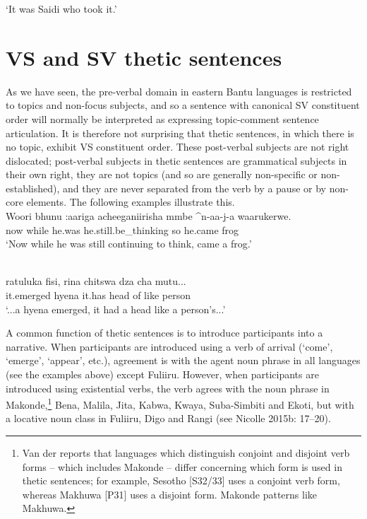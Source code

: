 \documentclass[output=paper]{langsci/langscibook}
\begin{document}
\glt \textup{‘}\textup{It was Saidi who took it.’}
\z

\section{VS and SV thetic sentences}
As we have seen, the pre-verbal domain in eastern Bantu languages is restricted to topics and non-focus subjects, and so a sentence with canonical SV constituent order will normally be interpreted as expressing topic-comment sentence articulation. It is therefore not surprising that thetic sentences, in which there is no topic, exhibit VS constituent order. These post-verbal subjects are not right dislocated; post-verbal subjects in thetic sentences are grammatical subjects in their own right, they are not topics (and so are generally non-specific or non-established), and they are never separated from the verb by a pause or by non-core elements. The following examples illustrate this.
\ea\label{ex:}
\\
\gll Woori bhunu :aariga acheeganiirisha mmbe \^{}n-aa-j-a waarukerwe.\\
now while he.was he.still.be\_thinking so he.came frog\\
‘Now while he was still continuing to think, came a frog.’
\z

\ea\label{ex:}
\\
\gll ratuluka fisi, rina chitswa dza cha mutu...\\
it.emerged hyena it.has head of like person\\
\upshape
‘...a hyena emerged, it had a head like a person’s...’
\z

A common function of thetic sentences is to introduce participants into a narrative. When participants are introduced using a verb of arrival (‘come’, ‘emerge’, ‘appear’, etc.), agreement is with the agent noun phrase in all languages (see the examples above) except Fuliiru. However, when participants are introduced using existential verbs, the verb agrees with the noun phrase in Makonde,\footnote{Van der \citet{Wal2008} reports that languages which distinguish conjoint and disjoint verb forms – which includes Makonde – differ concerning which form is used in thetic sentences; for example, Sesotho [S32/33] uses a conjoint verb form, whereas Makhuwa [P31] uses a disjoint form. Makonde patterns like Makhuwa.} Bena, Malila, Jita, Kabwa, Kwaya, Suba-Simbiti and Ekoti, but with a locative noun class in Fuliiru, Digo and Rangi (see Nicolle 2015b: 17–20).
\end{document}
